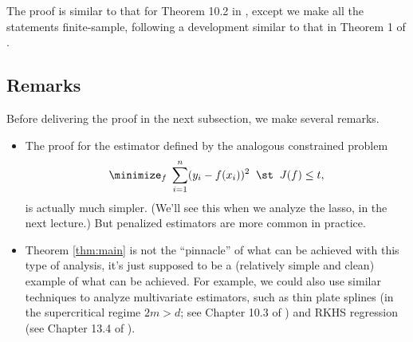 \documentclass{article}
\begin{document}
The proof is similar to that for Theorem 10.2 in \citet{vandegeer2000empirical},
except we make all the statements finite-sample, following a development similar
to that in Theorem 1 of \citet{sadhanala2019additive}.   

\subsection{Remarks} 

Before delivering the proof in the next subsection, we make several remarks.  

\begin{itemize}
\item The proof for the estimator defined by the analogous constrained problem 
  \[
  \minimize_f \; \sum_{i=1}^n (y_i - f(x_i))^2 \;\; \st \;\; J(f) \leq t,
  \]
  is actually much simpler. (We'll see this when we analyze the lasso, in the
  next lecture.) But penalized estimators are more common in practice. 

\item Theorem \ref{thm:main} is not the ``pinnacle'' of what can be achieved
  with this type of analysis, it's just supposed to be a (relatively simple and
  clean) example of what can be achieved. For example, we could also use similar
  techniques to analyze multivariate estimators, such as thin plate splines (in 
  the supercritical regime $2m > d$; see Chapter 10.3 of
  \citet{vandegeer2000empirical}) and RKHS regression (see Chapter 13.4 of
  \citealt{wainwright2019high}).    


\end{itemize}
\end{document}
